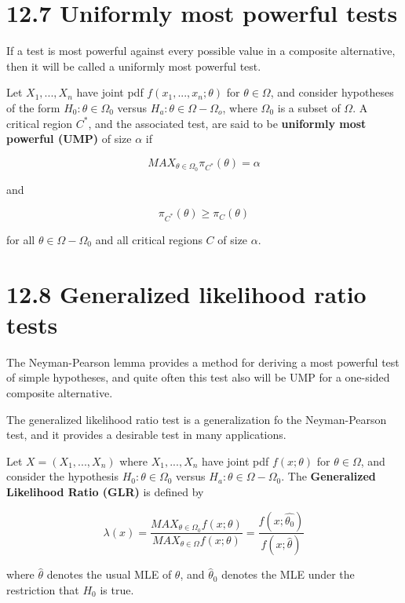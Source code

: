\documentclass[]{book}
\begin{document}
\hypertarget{uniformly-most-powerful-tests}{%
\section{12.7 Uniformly most powerful tests}\label{uniformly-most-powerful-tests}}

If a test is most powerful against every possible value in a composite alternative, then it will be called a uniformly most powerful test.

Let \(X_1,...,X_n\) have joint pdf \(f(x_1,...,x_n; \theta)\) for \(\theta \in \Omega\), and consider hypotheses of the form \(H_0:\theta \in \Omega_0\) versus \(H_a: \theta \in \Omega -\Omega_o\), where \(\Omega_0\) is a subset of \(\Omega\). A critical region \(C^*\), and the associated test, are said to be \textbf{uniformly most powerful (UMP)} of size \(\alpha\) if

\[MAX_{\theta \in \Omega_0} \pi_{C^*}(\theta)=\alpha\]

and

\[\pi_{C^*}(\theta) \geq \pi_C(\theta)\]

for all \(\theta \in \Omega-\Omega_0\) and all critical regions \(C\) of size \(\alpha\).

\hypertarget{generalized-likelihood-ratio-tests}{%
\section{12.8 Generalized likelihood ratio tests}\label{generalized-likelihood-ratio-tests}}

The Neyman-Pearson lemma provides a method for deriving a most powerful test of simple hypotheses, and quite often this test also will be UMP for a one-sided composite alternative.

The generalized likelihood ratio test is a generalization fo the Neyman-Pearson test, and it provides a desirable test in many applications.

Let \(X=(X_1,...,X_n)\) where \(X_1,...,X_n\) have joint pdf \(f(x;\theta)\) for \(\theta \in \Omega\), and consider the hypothesis \(H_0: \theta \in \Omega_0\) versus \(H_a: \theta \in \Omega-\Omega_0\). The \textbf{Generalized Likelihood Ratio (GLR)} is defined by

\[\lambda (x)=\frac{MAX_{\theta\in\Omega_0}f(x;\theta)}{MAX_{\theta\in\Omega}f(x;\theta)}=\frac{f(x;\hat{\theta_0})}{f(x;\hat{\theta})}\]

where \(\hat{\theta}\) denotes the usual MLE of \(\theta\), and \(\hat{\theta}_0\) denotes the MLE under the restriction that \(H_0\) is true.
\end{document}

